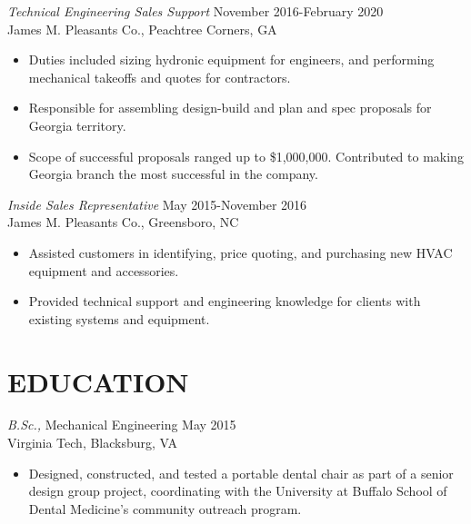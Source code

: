 \documentclass[margin]{res}
\begin{document}
\begin{resume}
    {\sl Technical Engineering Sales Support} \hfill November 2016-February 2020 \\
        James M. Pleasants Co., Peachtree Corners, GA
        \begin{itemize}  \itemsep -2pt %
            \item Duties included sizing hydronic equipment for engineers, and performing mechanical takeoffs and quotes for contractors.
            \item Responsible for assembling design-build and plan and spec proposals for Georgia territory.
            \item Scope of successful proposals ranged up to \$1,000,000. Contributed to making Georgia branch the most successful in the company.
            \end{itemize}

    {\sl Inside Sales Representative} \hfill May 2015-November 2016 \\
 	    James M. Pleasants Co., Greensboro, NC
        \begin{itemize}  \itemsep -2pt %
            \item Assisted customers in identifying, price quoting, and purchasing new HVAC equipment and accessories.
            \item Provided technical support and engineering knowledge for clients with existing systems and equipment.
            \end{itemize}
 

\section{EDUCATION} {\sl B.Sc.,} Mechanical Engineering \hfill  May 2015 \\
    Virginia Tech, Blacksburg, VA
    \begin{itemize}  \itemsep -2pt %
        \item Designed, constructed, and tested a portable dental chair as part of a senior design group project, coordinating with the University at Buffalo School of Dental Medicine's community outreach program.
    \end{itemize}
 

\end{resume}
\end{document}
